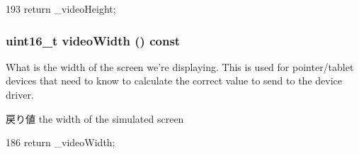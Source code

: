 \begin{DoxyCode}
193 { return _videoHeight; }
\end{DoxyCode}
\hypertarget{classVncInput_ab1e9571fac3dd138effbc19ec81536ce}{
\subsubsection[{videoWidth}]{\setlength{\rightskip}{0pt plus 5cm}uint16\_\-t videoWidth () const}}
\label{classVncInput_ab1e9571fac3dd138effbc19ec81536ce}
What is the width of the screen we're displaying. This is used for pointer/tablet devices that need to know to calculate the correct value to send to the device driver. \begin{DoxyReturn}{戻り値}
the width of the simulated screen 
\end{DoxyReturn}



\begin{DoxyCode}
186 { return _videoWidth; }
\end{DoxyCode}


